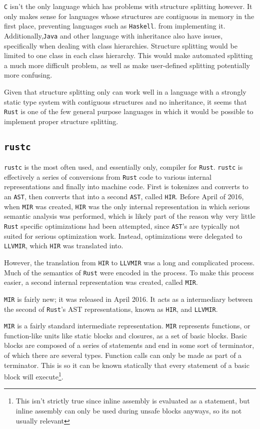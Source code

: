 \documentclass[prodmode,acmtecs]{acmsmall} %
\newcommand{\rustname}{{\texttt{Rust}}}
\def \rust {\rustname{}\xspace}
\newcommand{\rustcname}{{\texttt{rustc}}}
\def \rustc {\rustcname{}\xspace}
\newcommand{\cname}{{\texttt{C}}}
\def \c {\cname{}\xspace}
\newcommand{\mirname}{{\texttt{MIR}}}
\def \mir {\mirname{}\xspace}
\newcommand{\hirname}{{\texttt{HIR}}}
\def \hir {\hirname{}\xspace}
\newcommand{\llvmirname}{{\texttt{LLVMIR}}}
\def \llvmir {\llvmirname{}\xspace}
\begin{document}
\c isn't the only language which has problems with structure splitting
however. It only makes sense for languages whose structures are contiguous
in memory in the first place, preventing languages such as \texttt{Haskell}.
from implementing it.  Additionally,\texttt{Java} and 
other language with inheritance also
have issues, specifically when dealing with class hierarchies. Structure
splitting would be limited to one class in each class hierarchy. This would
make automated splitting a much more difficult problem, as well as 
make user-defined splitting potentially more confusing.

Given that structure splitting only can work well in a language with
a strongly static type system with contiguous structures and no inheritance,
it seems that \rust is one of the few general purpose languages in which
it would be possible to implement proper structure splitting.

\subsection{\rustc}
\label{sec:rustc}

\rustc is the most often used, and essentially only, compiler for \rust.
\rustc is effectively a series of conversions from
\rust code to various internal representations and finally into machine code.
First is tokenizes and converts to an \texttt{AST}, then converts that into a
second \texttt{AST}, called \hir. Before April of 2016, when \mir was created,
\hir was the only
internal representation in which serious semantic analysis was performed, which
is likely part of the reason why very little \rust specific optimizations had
been attempted, since \texttt{AST}'s are typically not suited for serious
optimization work. Instead, optimizations were delegated to \llvmir, which \hir
was translated into.

However, the translation from \hir to \llvmir was a long and complicated process.
Much of the semantics of \rust were encoded in the process. To make this 
process easier, a second internal representation was created, called \mir.	


\subsubsubsection{\mir}
\mir is fairly new; it was released in April 2016\cite{mirintro}. It acts as a
intermediary between the second of \rust's AST representations, known as \hir,
and \llvmir.

\mir is a fairly standard intermediate representation. \mir represents functions, 
or function-like units like static blocks and closures, 
as a set of basic blocks. Basic blocks are composed of a series of statements
and end in some sort of terminator, of which there are several types. 
Function calls can only be made as part of a terminator. This is
so it can be known statically that every statement of a basic block will
execute\footnote{This isn't strictly true since inline assembly is evaluated as
  a statement, but inline assembly can only be used during unsafe blocks
  anyways, so its not usually relevant}.
\end{document}
